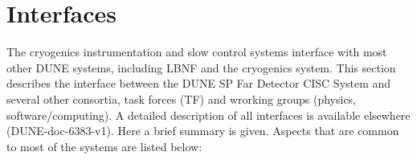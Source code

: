 \section{Interfaces}
\label{sec:fdsp-slow-cryo-intfc}



The cryogenics instrumentation and slow control systems interface with most other DUNE systems, including LBNF and the cryogenics system.
This section describes the interface between the DUNE SP Far Detector CISC System
and several other consortia, task forces (TF) and wrorking groups (physics, software/computing). 
A detailed description of all interfaces is available elsewhere (DUNE-doc-6383-v1). Here a brief summary is given.
Aspects that are common to most of the systems are listed below: 

